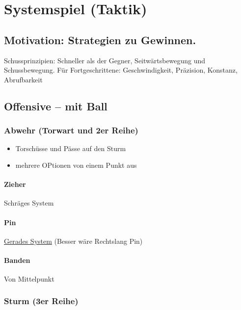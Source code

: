 \chapter{Systemspiel (Taktik)}
\label{taktik}

\section{Motivation: Strategien zu Gewinnen.}

Schussprinzipien: Schneller als der Gegner, Seitwärtsbewegung und Schussbewegung. Für Fortgeschrittene: Geschwindigkeit, Präzision, Konstanz, Abrufbarkeit

\section{Offensive -- mit Ball}

\subsection{Abwehr (Torwart und 2er Reihe)}
\label{taktik:offensive:abwehr}

\begin{itemize}
    \item Torschüsse und Pässe auf den Sturm 
    \item mehrere OPtionen von einem Punkt aus
\end{itemize}

\subsubsection{Zieher}
Schräges System

\subsubsection{Pin}
\href{http://ungeblogtkickern.blogspot.de/2014/12/schusssystem-linkslang-pin-aus-der.html}{Gerades System}
(Besser wäre Rechtslang Pin)

\subsubsection{Banden}
Von Mittelpunkt



\subsection{Sturm (3er Reihe)}
\label{taktik:offensive:sturm}

